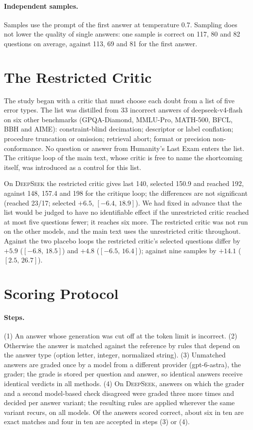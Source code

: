 \documentclass[11pt]{article}
\newcommand{\ds}{\textsc{DeepSeek}}
\newcommand{\ci}[2]{$[#1,\,#2]$}
\begin{document}
\paragraph{Independent samples.}
Samples use the prompt of the first answer at temperature 0.7.
Sampling does not lower the quality of single answers: one sample is correct on 117, 80 and 82 questions on average, against 113, 69 and 81 for the first answer.

\section{The Restricted Critic}
\label{app:bank}

The study began with a critic that must choose each doubt from a list of five error types.
The list was distilled from 33 incorrect answers of deepseek-v4-flash on six other benchmarks (GPQA-Diamond, MMLU-Pro, MATH-500, BFCL, BBH and AIME): constraint-blind decimation; descriptor or label conflation; procedure truncation or omission; retrieval abort; format or precision non-conformance.
No question or answer from Humanity's Last Exam enters the list.
The critique loop of the main text, whose critic is free to name the shortcoming itself, was introduced as a control for this list.

On \ds{} the restricted critic gives last 140, selected 150.9 and reached 192, against 148, 157.4 and 198 for the critique loop; the differences are not significant (reached 23/17; selected $+6.5$, \ci{-6.4}{18.9}).
We had fixed in advance that the list would be judged to have no identifiable effect if the unrestricted critic reached at most five questions fewer; it reaches six more.
The restricted critic was not run on the other models, and the main text uses the unrestricted critic throughout.
Against the two placebo loops the restricted critic's selected questions differ by $+5.9$ (\ci{-6.8}{18.5}) and $+4.8$ (\ci{-6.5}{16.4}); against nine samples by $+14.1$ (\ci{2.5}{26.7}).

\section{Scoring Protocol}
\label{app:scoring}

\paragraph{Steps.}
(1) An answer whose generation was cut off at the token limit is incorrect.
(2) Otherwise the answer is matched against the reference by rules that depend on the answer type (option letter, integer, normalized string).
(3) Unmatched answers are graded once by a model from a different provider (gpt-6-astra), the grader; the grade is stored per question and answer, so identical answers receive identical verdicts in all methods.
(4) On \ds, answers on which the grader and a second model-based check disagreed were graded three more times and decided per answer variant; the resulting rules are applied wherever the same variant recurs, on all models.
Of the answers scored correct, about six in ten are exact matches and four in ten are accepted in steps (3) or (4).
\end{document}
